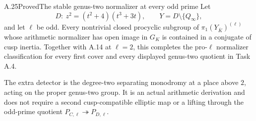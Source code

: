 \begin{statement}{A.25}{Proved}{The stable genus-two normalizer at every odd prime}
Let
\[
 D:\ z^2=(t^2+4)(t^3+3t),\qquad
 Y=D\setminus\{Q_\infty\},
\]
and let $\ell$ be odd. Every nontrivial closed procyclic
subgroup of $\pi_1(Y_{\overline K})^{(\ell)}$ whose
arithmetic normalizer has open image in $G_K$ is contained
in a conjugate of cusp inertia.
Together with A.14 at $\ell=2$, this completes the
pro-$\ell$ normalizer classification for every first cover
and every displayed genus-two quotient in Task A.4.

The extra detector is the degree-two separating monodromy
at a place above $2$, acting on the proper genus-two group.
It is an actual arithmetic derivation and does not require
a second cusp-compatible elliptic map or a lifting through
the odd-prime quotient $P_{C,\ell}\twoheadrightarrow P_{D,\ell}$.
\end{statement}

